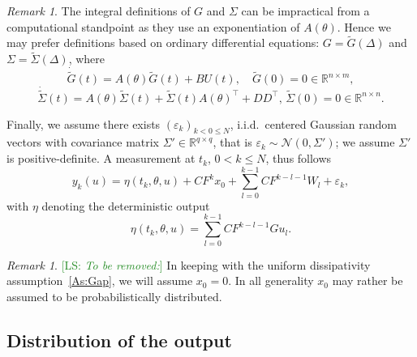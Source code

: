 \documentclass[twocolumn]{autart}
\newcommand{\LS}[1]{{\textcolor{ForestGreen}{[LS: \textit{#1}]}}}
\newcommand{\LP}[1]{{\textcolor{purple}{[LP: \textit{#1}]}}}
\theoremstyle{definition}
\theoremstyle{remark}
\newtheorem{remark}[theorem]{Remark}
\newcommand{\R}{\mathbb{R}}
\begin{document}
\begin{remark}
The integral definitions of $G$ and $\Sigma$ can be  impractical from a computational standpoint as they use an exponentiation of $A(\theta)$. Hence we may prefer definitions based on ordinary differential equations: $G=\tilde G(\Delta)$ and $\Sigma=\tilde \Sigma(\Delta)$, where 
$$
\dot{\tilde{G}}(t)= A(\theta)\tilde{G}(t)+BU(t),\quad {\tilde{G}}(0)=0\in \R^{n\times m},
$$
$$
\dot{\tilde{\Sigma}}(t)= A(\theta)\tilde{\Sigma}(t)+\tilde{\Sigma}(t)A(\theta)^{\top}+D D^\top ,\,{\tilde{\Sigma}}(0)=0\in \R^{n\times n}.
$$
\end{remark}
Finally, we assume there exists $(\varepsilon_k)_{k< 0 \leq N}$, i.i.d.\ centered Gaussian random vectors with covariance matrix $\Sigma'\in \R^{q\times q}$, that is $\varepsilon_k\sim \mathcal{N}(0,\Sigma')$; we assume $\Sigma'$ is  positive-definite. A measurement  at $t_k$, $0< k \leq  N$, thus follows
\begin{equation}\label{E:measurement}
y_k(u)
=\eta(t_k,\theta,u)+CF^{k}x_0+\sum_{l=0}^{k-1} C F^{k-l-1}W_{l}+\varepsilon_k,
\end{equation}
with $\eta$ denoting the deterministic output
\begin{equation}\label{E:output}
\eta(t_k,\theta,u)
=
\sum_{l=0}^{k-1} C F^{k-l-1}Gu_{l} .
\end{equation}

\begin{remark}
\LS{To be removed:}
In keeping with the uniform dissipativity assumption~\ref{As:Gap}, we will assume $x_0=0$. In all generality $x_0$ may rather be assumed to be probabilistically distributed.
\end{remark}

\subsection{Distribution of the output}
\end{document}
